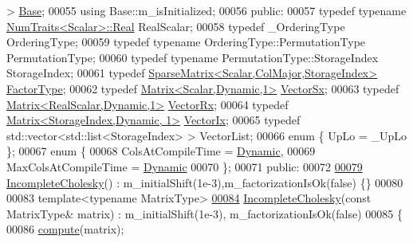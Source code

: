 \begin{DoxyCode}
       > \hyperlink{group___sparse_core___module}{Base};
00055     \textcolor{keyword}{using} Base::m\_isInitialized;
00056   \textcolor{keyword}{public}:
00057     \textcolor{keyword}{typedef} \textcolor{keyword}{typename} \hyperlink{group___core___module_struct_eigen_1_1_num_traits}{NumTraits<Scalar>::Real} RealScalar; 
00058     \textcolor{keyword}{typedef} \_OrderingType OrderingType;
00059     \textcolor{keyword}{typedef} \textcolor{keyword}{typename} OrderingType::PermutationType PermutationType;
00060     \textcolor{keyword}{typedef} \textcolor{keyword}{typename} PermutationType::StorageIndex StorageIndex; 
00061     \textcolor{keyword}{typedef} \hyperlink{group___sparse_core___module}{SparseMatrix<Scalar,ColMajor,StorageIndex>} 
      \hyperlink{group___sparse_core___module}{FactorType};
00062     \textcolor{keyword}{typedef} \hyperlink{group___core___module}{Matrix<Scalar,Dynamic,1>} \hyperlink{group___core___module}{VectorSx};
00063     \textcolor{keyword}{typedef} \hyperlink{group___core___module}{Matrix<RealScalar,Dynamic,1>} \hyperlink{group___core___module}{VectorRx};
00064     \textcolor{keyword}{typedef} \hyperlink{group___core___module}{Matrix<StorageIndex,Dynamic, 1>} 
      \hyperlink{group___core___module}{VectorIx};
00065     \textcolor{keyword}{typedef} std::vector<std::list<StorageIndex> > VectorList; 
00066     \textcolor{keyword}{enum} \{ UpLo = \_UpLo \};
00067     \textcolor{keyword}{enum} \{
00068       ColsAtCompileTime = \hyperlink{namespace_eigen_ad81fa7195215a0ce30017dfac309f0b2}{Dynamic},
00069       MaxColsAtCompileTime = \hyperlink{namespace_eigen_ad81fa7195215a0ce30017dfac309f0b2}{Dynamic}
00070     \};
00071   \textcolor{keyword}{public}:
00072 
\hyperlink{class_eigen_1_1_incomplete_cholesky_adaaa3975b8cf53f910d6a3344af92379}{00079}     \hyperlink{class_eigen_1_1_incomplete_cholesky_adaaa3975b8cf53f910d6a3344af92379}{IncompleteCholesky}() : m\_initialShift(1e-3),m\_factorizationIsOk(false) \{\}
00080     
00083     \textcolor{keyword}{template}<\textcolor{keyword}{typename} MatrixType>
\hyperlink{class_eigen_1_1_incomplete_cholesky_a757499fc814988a5b112b1f34d0295e1}{00084}     \hyperlink{class_eigen_1_1_incomplete_cholesky_a757499fc814988a5b112b1f34d0295e1}{IncompleteCholesky}(\textcolor{keyword}{const} MatrixType& matrix) : m\_initialShift(1e-3),
      m\_factorizationIsOk(false)
00085     \{
00086       \hyperlink{class_eigen_1_1_incomplete_cholesky_a7966bedeebbeaa7a8fe4dd1da3797a0b}{compute}(matrix);

\end{DoxyCode}
